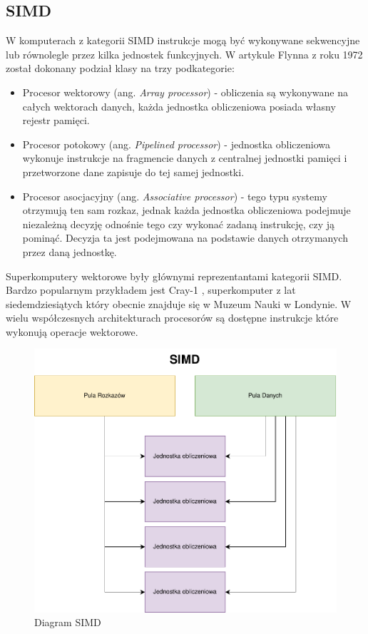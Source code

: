 \documentclass[a4paper,12pt]{book} %
\begin{document}
\subsection{SIMD}
W komputerach z kategorii SIMD instrukcje mogą być wykonywane sekwencyjne lub równolegle przez kilka jednostek funkcyjnych. W artykule Flynna z roku 1972 \cite{Flynn1972} został dokonany podział klasy na trzy podkategorie:
\begin{itemize}
	\item Procesor wektorowy (ang. \emph{Array processor}) - obliczenia są wykonywane na całych wektorach danych, każda jednostka obliczeniowa posiada własny rejestr pamięci.
	\item Procesor potokowy (ang. \emph{Pipelined processor}) - jednostka obliczeniowa wykonuje instrukcje na fragmencie danych z centralnej jednostki pamięci i przetworzone dane zapisuje do tej samej jednostki.
	\item Procesor asocjacyjny (ang. \emph{Associative processor}) - tego typu systemy otrzymują ten sam rozkaz, jednak każda jednostka obliczeniowa podejmuje niezależną decyzję odnośnie tego czy wykonać zadaną instrukcję, czy ją pominąć. Decyzja ta jest podejmowana na podstawie danych otrzymanych przez daną jednostkę.
\end{itemize}
Superkomputery wektorowe były głównymi reprezentantami kategorii SIMD. Bardzo popularnym przykładem jest Cray-1 \cite{Cray-1}, superkomputer z lat siedemdziesiątych który obecnie znajduje się w Muzeum Nauki w Londynie. W wielu współczesnych architekturach procesorów są dostępne instrukcje które wykonują operacje wektorowe.
\begin{figure}[h]
	\centering
	\includegraphics[scale=0.7]{assets/SIMD.pdf}
	\caption{Diagram SIMD}
	\label{SIMD}
\end{figure}
\newpage
\end{document}
